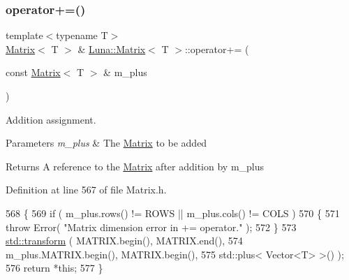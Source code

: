 \subsubsection{\texorpdfstring{operator+=()}{operator+=()}\hspace{0.1cm}{\footnotesize\ttfamily [1/2]}}
{\footnotesize\ttfamily template$<$typename T$>$ \\
\hyperlink{classLuna_1_1Matrix}{Matrix}$<$ T $>$ \& \hyperlink{classLuna_1_1Matrix}{Luna\+::\+Matrix}$<$ T $>$\+::operator+= (\begin{DoxyParamCaption}\item[{const \hyperlink{classLuna_1_1Matrix}{Matrix}$<$ T $>$ \&}]{m\+\_\+plus }\end{DoxyParamCaption})\hspace{0.3cm}{\ttfamily [inline]}}



Addition assignment. 


\begin{DoxyParams}{Parameters}
{\em m\+\_\+plus} & The \hyperlink{classLuna_1_1Matrix}{Matrix} to be added \\
\hline
\end{DoxyParams}
\begin{DoxyReturn}{Returns}
A reference to the \hyperlink{classLuna_1_1Matrix}{Matrix} after addition by m\+\_\+plus 
\end{DoxyReturn}


Definition at line 567 of file Matrix.\+h.


\begin{DoxyCode}
568   \{
569     \textcolor{keywordflow}{if} ( m\_plus.rows() != ROWS || m\_plus.cols() != COLS )
570     \{
571       \textcolor{keywordflow}{throw} Error( \textcolor{stringliteral}{"Matrix dimension error in += operator."} );
572     \}
573     \hyperlink{namespaceHeat__plot_aeaa6785bedcad63b4bd40e8cb1bad8a0}{std::transform} ( MATRIX.begin(), MATRIX.end(),
574                      m\_plus.MATRIX.begin(), MATRIX.begin(),
575                      std::plus< Vector<T> >() );
576     \textcolor{keywordflow}{return} *\textcolor{keyword}{this};
577   \}
\end{DoxyCode}
\mbox{\label{classLuna_1_1Matrix_a6e19b5d45b923db766eddcc771af1b89}} 
